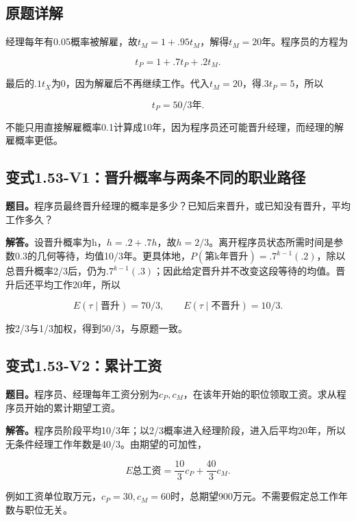 \documentclass[
  11pt,
  a4paper,
  UTF8,
  fontset=fandol]{ctexart}
\begin{document}
\subsection{原题详解}\label{ux539fux9898ux8be6ux89e3-11}

经理每年有0.05概率被解雇，故\(t_M=1+.95t_M\)，解得\(t_M=20\)年。程序员的方程为

\[
t_P=1+.7t_P+.2t_M.
\]

最后的\(.1t_X\)为0，因为解雇后不再继续工作。代入\(t_M=20\)，得\(.3t_P=5\)，所以

\[
\boxed{t_P=50/3\text{年}.}
\]

不能只用直接解雇概率0.1计算成10年，因为程序员还可能晋升经理，而经理的解雇概率更低。

\subsection{变式1.53-V1：晋升概率与两条不同的职业路径}\label{ux53d8ux5f0f1.53-v1ux664bux5347ux6982ux7387ux4e0eux4e24ux6761ux4e0dux540cux7684ux804cux4e1aux8defux5f84}

\textbf{题目。}程序员最终晋升经理的概率是多少？已知后来晋升，或已知没有晋升，平均工作多久？

\textbf{解答。}设晋升概率为h，\(h=.2+.7h\)，故\(h=2/3\)。离开程序员状态所需时间是参数0.3的几何等待，均值10/3年。更具体地，\(P(\text{第k年晋升})=.7^{k-1}(.2)\)，除以总晋升概率2/3后，仍为\(.7^{k-1}(.3)\)；因此给定晋升并不改变这段等待的均值。晋升后还平均工作20年，所以

\[
\boxed{E(\tau\mid\text{晋升})=70/3,\qquad
E(\tau\mid\text{不晋升})=10/3.}
\]

按2/3与1/3加权，得到\(50/3\)，与原题一致。

\subsection{变式1.53-V2：累计工资}\label{ux53d8ux5f0f1.53-v2ux7d2fux8ba1ux5de5ux8d44}

\textbf{题目。}程序员、经理每年工资分别为\(c_P,c_M\)，在该年开始的职位领取工资。求从程序员开始的累计期望工资。

\textbf{解答。}程序员阶段平均10/3年；以2/3概率进入经理阶段，进入后平均20年，所以无条件经理工作年数是40/3。由期望的可加性，

\[
\boxed{E\text{总工资}=\frac{10}{3}c_P+\frac{40}{3}c_M.}
\]

例如工资单位取万元，\(c_P=30,c_M=60\)时，总期望900万元。不需要假定总工作年数与职位无关。
\end{document}
